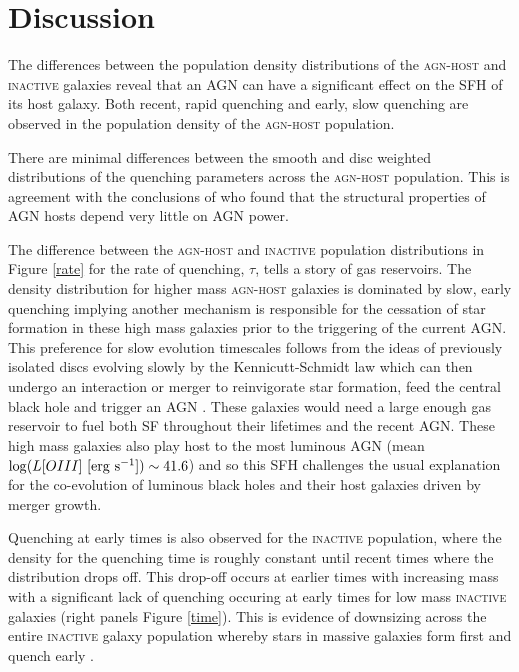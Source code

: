 \documentclass[useAMS,usenatbib]{mn2e}
\def\changed    {\color{nc} }
\def\secondchange    {\color{srv} }
\begin{document}
\section{Discussion}\label{dis}

The differences between the {\secondchange population density distributions} of the \textsc{agn-host} and \textsc{inactive} galaxies reveal that an AGN can have a significant effect on the SFH of its host galaxy. Both recent, rapid quenching and early, slow quenching are observed in the {\secondchange population density} of the \textsc{agn-host} population. 


{\changed There are minimal differences between the smooth and disc weighted distributions of the quenching parameters across the \textsc{agn-host} population. This is agreement with the conclusions of \citet*{Kauff03b} who found that the structural properties of AGN hosts depend very little on AGN power. }


The difference between the \textsc{agn-host} and \textsc{inactive} {\secondchange population distributions} in Figure \ref{rate} for the rate of quenching, $\tau$, tells a story of gas reservoirs. The {\secondchange density distribution} for higher mass \textsc{agn-host} galaxies is dominated by slow, early quenching implying another mechanism is responsible for the cessation of star formation in these high mass galaxies prior to the triggering of the current AGN.  This preference for slow evolution timescales follows from the ideas of previously isolated discs evolving slowly by the Kennicutt-Schmidt \citep{Schmidt59, Kennicutt97} law which can then undergo an interaction or merger to reinvigorate star formation, feed the central black hole and trigger an AGN \citep{Varela04, Em15}. These galaxies would need a large enough gas reservoir to fuel both SF throughout their lifetimes and the recent AGN. These high mass galaxies also play host to the most luminous AGN (mean $\log (L[OIII] ~[\rm{erg}~s^{-1}]) \sim 41.6$) and so this SFH challenges the usual explanation for the co-evolution of luminous black holes and their host galaxies driven by merger growth. 



Quenching at early times is also observed for the \textsc{inactive} population, where the {\secondchange density} for the quenching time is roughly constant until recent times where the distribution drops off. {\changed This drop-off occurs at earlier times with increasing mass with a significant lack of quenching occuring at early times for low mass \textsc{inactive} galaxies} (right panels Figure \ref{time}). This is evidence of downsizing across the entire \textsc{inactive} galaxy population whereby stars in massive galaxies form first and quench early \citep{Cowie96, Thomas10}. 
\end{document}
